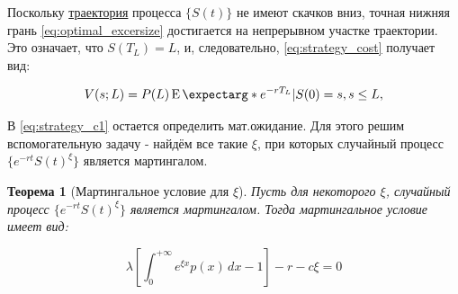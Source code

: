 \documentclass[a4paper,12pt]{article}
\newtheorem{theorem}{Теорема}
\theoremstyle{definition}
\newcommand{\expect}{\operatorname{E}\expectarg}
\begin{document}
Поскольку \hyperref[fig:model1tracklcross]{траектория} процесса $\{S(t)\}$ не имеют скачков вниз, точная нижняя грань \eqref{eq:optimal_excersize} достигается на непрерывном участке траектории. Это означает, что $S(T_L) = L$, и, следовательно, \eqref{eq:strategy_cost} получает вид:

\begin{equation}\label{eq:strategy_c1}
V(s; L) = P(L) \expect*{e^{-rT_L} | S(0) = s}, s \le L,
\end{equation}

В \eqref{eq:strategy_c1} остается определить мат.ожидание. Для этого решим вспомогательную задачу - найдём все такие $\xi$, при которых случайный процесс $\{e^{-rt}S(t)^{\xi}\}$ является мартингалом.

\begin{theorem}[Мартингальное условие для $\xi$]\label{thm:martingale_cond_for_xi}
Пусть для некоторого $\xi$, случайный процесс $\{e^{-rt}S(t)^{\xi}\}$ является мартингалом. Тогда мартингальное условие имеет вид:

\begin{equation}\label{eq:martingale_cond_for_xi_log}
\lambda \left[ \int_{0}^{+\infty} e^{\xi x} p(x) \,dx - 1  \right] - r - c \xi
 = 0
\end{equation}

\end{theorem}
\end{document}
